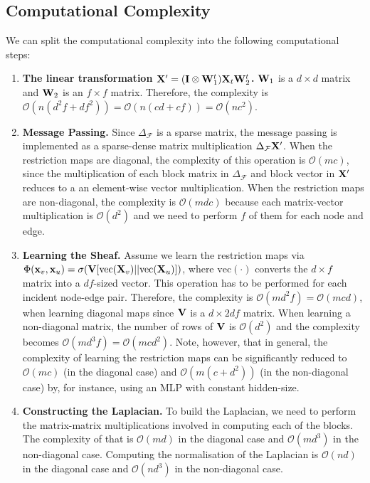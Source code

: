 \documentclass{article}
\def\vx{{\bf{x}}}
\def\mI{{\bf{I}}}
\def\mV{{\bf{V}}}
\def\mW{{\bf{W}}}
\def\mX{{\bf{X}}}
\def\gF{{\mathcal{F}}}
\def\gO{{\mathcal{O}}}
\begin{document}
\subsection{Computational Complexity}\label{app:complexity}

We can split the computational complexity into the following computational steps:
\begin{enumerate}
    \item \textbf{The linear transformation $\mX' = (\mI \otimes \mW_1^t) \mX_t \mW_2^t$. } $\mW_1$ is a $d \times d$ matrix and $\mW_2$ is an $f \times f$ matrix. Therefore, the complexity is $\gO\left(n(d^2f + df^2)\right) = \gO\left(n(cd + cf)\right) = \gO(nc^2)$. 
    \item \textbf{Message Passing. } Since $\Delta_\gF$ is a sparse matrix, the message passing is implemented as a sparse-dense matrix multiplication $\Delta_\gF \mX'$. When the restriction maps are diagonal, the complexity of this operation is $\gO\left(mc\right)$, since the multiplication of each block matrix in $\Delta_\gF$ and block vector in $\mX'$ reduces to a an element-wise vector multiplication. When the restriction maps are non-diagonal, the complexity is $\gO\left(mdc\right)$ because each matrix-vector multiplication is $\gO(d^2)$ and we need to perform $f$ of them for each node and edge. 
    \item \textbf{Learning the Sheaf. } Assume we learn the restriction maps via $\Phi(\vx_v, \vx_u) = \sigma(\mV [\mathrm{vec}(\mX_v)|| \mathrm{vec}(\mX_u)])$, where $\mathrm{vec}(\cdot)$ converts the $d \times f$ matrix into a $df$-sized vector. This operation has to be performed for each incident node-edge pair. Therefore, the complexity is $\gO(md^2f) = \gO(mcd)$, when learning diagonal maps since $\mV$ is a $d \times 2df$ matrix. When learning a non-diagonal matrix, the number of rows of $\mV$ is $\gO(d^2)$ and the complexity becomes $\gO(md^3f) = \gO(mcd^2)$. Note, however, that in general, the complexity of learning the restriction maps can be significantly reduced to $\gO(mc)$ (in the diagonal case) and $\gO(m(c + d^2))$ (in the non-diagonal case) by, for instance, using an MLP with constant hidden-size. 
    \item \textbf{Constructing the Laplacian. } To build the Laplacian, we need to perform the matrix-matrix multiplications involved in computing each of the blocks. The complexity of that is $\gO(md)$ in the diagonal case and $\gO(md^3)$ in the non-diagonal case. Computing the normalisation of the Laplacian is $\gO(nd)$ in the diagonal case and $\gO(nd^3)$ in the non-diagonal case.
\end{enumerate}
\end{document}
